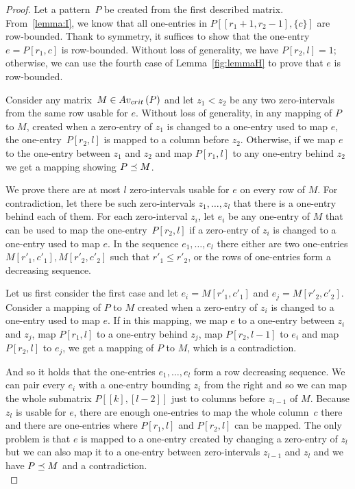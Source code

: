\begin{proof}
Let a pattern~$P$ be created from the first described matrix. From~\ref{lemma:I}, we know that all one-entries in $P[[r_1+1,r_2-1],\{c\}]$ are row-bounded. Thank to symmetry, it suffices to show that the one-entry~$e=P[r_1,c]$ is row-bounded. Without loss of generality, we have $P[r_2,l]=1$; otherwise, we can use the fourth case of Lemma~\ref{fig:lemmaH} to prove that $e$ is row-bounded.

Consider any matrix~$M\in Av_{crit}\left(P\right)$ and let $z_1<z_2$ be any two zero-intervals from the same row usable for $e$. Without loss of generality, in any mapping of $P$ to $M$, created when a zero-entry of $z_1$ is changed to a one-entry used to map $e$, the one-entry~$P[r_2,l]$ is mapped to a column before $z_2$. Otherwise, if we map $e$ to the one-entry between $z_1$ and $z_2$ and map $P[r_1,l]$ to any one-entry behind $z_2$ we get a mapping showing $P\preceq M$.

We prove there are at most $l$ zero-intervals usable for $e$ on every row of $M$. For contradiction, let there be such zero-intervals $z_1,\dots,z_l$ that there is a one-entry behind each of them. For each zero-interval $z_i$, let $e_i$ be any one-entry of $M$ that can be used to map the one-entry~$P[r_2,l]$ if a zero-entry of $z_i$ is changed to a one-entry used to map $e$. In the sequence $e_1,\dots,e_l$ there either are two one-entries $M[r'_1,c'_1],M[r'_2,c'_2]$ such that $r'_1\leq r'_2$, or the rows of one-entries form a decreasing sequence.

Let us first consider the first case and let $e_i=M[r'_1,c'_1]$ and $e_j=M[r'_2,c'_2]$. Consider a mapping of $P$ to $M$ created when a zero-entry of $z_i$ is changed to a one-entry used to map $e$. If in this mapping, we map $e$ to a one-entry between $z_i$ and $z_j$, map $P[r_1,l]$ to a one-entry behind $z_j$, map $P[r_2,l-1]$ to $e_i$ and map $P[r_2,l]$ to $e_j$, we get a mapping of $P$ to $M$, which is a contradiction.

And so it holds that the one-entries $e_1,\dots,e_l$ form a row decreasing sequence. We can pair every $e_i$ with a one-entry bounding $z_i$ from the right and so we can map the whole submatrix $P[[k],[l-2]]$ just to columns before $z_{l-1}$ of $M$. Because $z_l$ is usable for $e$, there are enough one-entries to map the whole column~$c$ there and there are one-entries where $P[r_1,l]$ and $P[r_2,l]$ can be mapped. The only problem is that $e$ is mapped to a one-entry created by changing a zero-entry of $z_l$ but we can also map it to a one-entry between zero-intervals $z_{l-1}$ and $z_l$ and we have $P\preceq M$ and a contradiction.\\


\end{proof}
